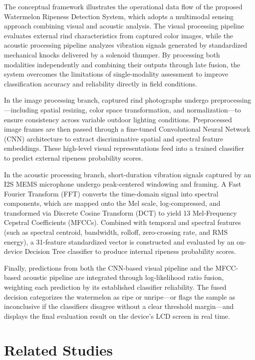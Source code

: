 \begin{thesisprose}
The conceptual framework illustrates the operational data flow of the proposed Watermelon Ripeness Detection System, which adopts a multimodal sensing approach combining visual and acoustic analysis. The visual processing pipeline evaluates external rind characteristics from captured color images, while the acoustic processing pipeline analyzes vibration signals generated by standardized mechanical knocks delivered by a solenoid thumper. By processing both modalities independently and combining their outputs through late fusion, the system overcomes the limitations of single-modality assessment to improve classification accuracy and reliability directly in field conditions.

In the image processing branch, captured rind photographs undergo preprocessing—including spatial resizing, color space transformation, and normalization—to ensure consistency across variable outdoor lighting conditions. Preprocessed image frames are then passed through a fine-tuned Convolutional Neural Network (CNN) architecture to extract discriminative spatial and spectral feature embeddings. These high-level visual representations feed into a trained classifier to predict external ripeness probability scores.

In the acoustic processing branch, short-duration vibration signals captured by an I2S MEMS microphone undergo peak-centered windowing and framing. A Fast Fourier Transform (FFT) converts the time-domain signal into spectral components, which are mapped onto the Mel scale, log-compressed, and transformed via Discrete Cosine Transform (DCT) to yield 13 Mel-Frequency Cepstral Coefficients (MFCCs). Combined with temporal and spectral features (such as spectral centroid, bandwidth, rolloff, zero-crossing rate, and RMS energy), a 31-feature standardized vector is constructed and evaluated by an on-device Decision Tree classifier to produce internal ripeness probability scores.

Finally, predictions from both the CNN-based visual pipeline and the MFCC-based acoustic pipeline are integrated through log-likelihood ratio fusion, weighting each prediction by its established classifier reliability. The fused decision categorizes the watermelon as ripe or unripe—or flags the sample as inconclusive if the classifiers disagree without a clear threshold margin—and displays the final evaluation result on the device's LCD screen in real time.

\section{Related Studies}


\end{thesisprose}
